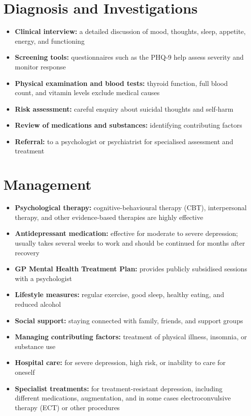 \section*{Diagnosis and Investigations}
\begin{itemize}
    \item \textbf{Clinical interview:} a detailed discussion of mood, thoughts, sleep, appetite, energy, and functioning
    \item \textbf{Screening tools:} questionnaires such as the PHQ-9 help assess severity and monitor response
    \item \textbf{Physical examination and blood tests:} thyroid function, full blood count, and vitamin levels exclude medical causes
    \item \textbf{Risk assessment:} careful enquiry about suicidal thoughts and self-harm
    \item \textbf{Review of medications and substances:} identifying contributing factors
    \item \textbf{Referral:} to a psychologist or psychiatrist for specialised assessment and treatment
\end{itemize}

\section*{Management}
\begin{itemize}
    \item \textbf{Psychological therapy:} cognitive-behavioural therapy (CBT), interpersonal therapy, and other evidence-based therapies are highly effective
    \item \textbf{Antidepressant medication:} effective for moderate to severe depression; usually takes several weeks to work and should be continued for months after recovery
    \item \textbf{GP Mental Health Treatment Plan:} provides publicly subsidised sessions with a psychologist
    \item \textbf{Lifestyle measures:} regular exercise, good sleep, healthy eating, and reduced alcohol
    \item \textbf{Social support:} staying connected with family, friends, and support groups
    \item \textbf{Managing contributing factors:} treatment of physical illness, insomnia, or substance use
    \item \textbf{Hospital care:} for severe depression, high risk, or inability to care for oneself
    \item \textbf{Specialist treatments:} for treatment-resistant depression, including different medications, augmentation, and in some cases electroconvulsive therapy (ECT) or other procedures
\end{itemize}

